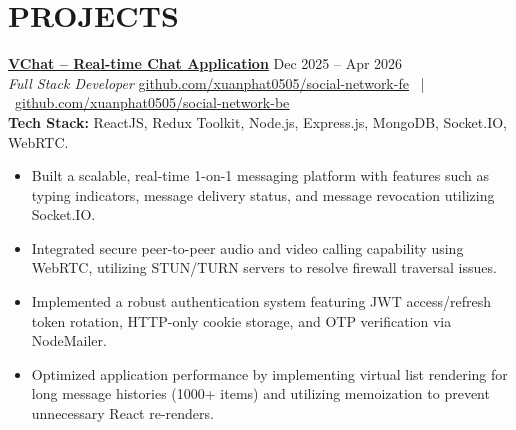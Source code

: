 \documentclass[10pt,a4paper]{article}
\begin{document}
\vspace{1pt}

\section*{PROJECTS}

\textbf{\href{https://chat-app-0505.netlify.app}{VChat -- Real-time Chat Application}} \hfill Dec 2025 -- Apr 2026 \\
\textit{Full Stack Developer} \hfill \href{https://github.com/xuanphat0505/social-network-fe}{\underline{github.com/xuanphat0505/social-network-fe}} \ | \ \href{https://github.com/xuanphat0505/social-network-be}{\underline{github.com/xuanphat0505/social-network-be}} \\
\textbf{Tech Stack:} ReactJS, Redux Toolkit, Node.js, Express.js, MongoDB, Socket.IO, WebRTC.
\begin{itemize}
    \item Built a scalable, real-time 1-on-1 messaging platform with features such as typing indicators, message delivery status, and message revocation utilizing Socket.IO.
    \item Integrated secure peer-to-peer audio and video calling capability using WebRTC, utilizing STUN/TURN servers to resolve firewall traversal issues.
    \item Implemented a robust authentication system featuring JWT access/refresh token rotation, HTTP-only cookie storage, and OTP verification via NodeMailer.
    \item Optimized application performance by implementing virtual list rendering for long message histories (1000+ items) and utilizing memoization to prevent unnecessary React re-renders.
\end{itemize}

\vspace{3pt}
\end{document}
